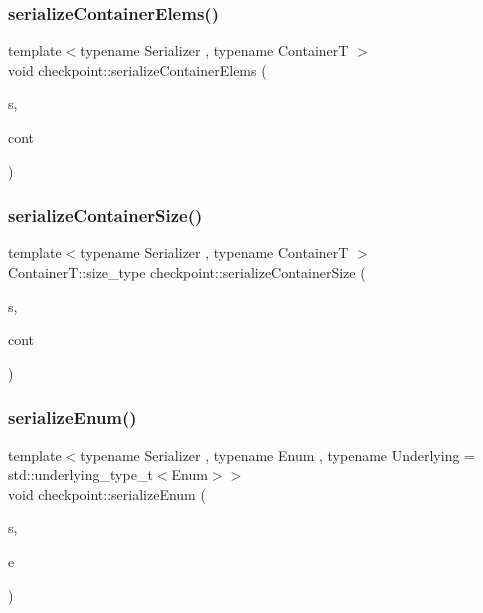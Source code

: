 \subsubsection{\texorpdfstring{serialize\+Container\+Elems()}{serializeContainerElems()}}
{\footnotesize\ttfamily template$<$typename Serializer , typename ContainerT $>$ \\
void checkpoint\+::serialize\+Container\+Elems (\begin{DoxyParamCaption}\item[{Serializer \&}]{s,  }\item[{ContainerT \&}]{cont }\end{DoxyParamCaption})\hspace{0.3cm}{\ttfamily [inline]}}

\mbox{\label{namespacecheckpoint_a3359595d5a4c6fcf5fc95069c71f869b}} 
\subsubsection{\texorpdfstring{serialize\+Container\+Size()}{serializeContainerSize()}}
{\footnotesize\ttfamily template$<$typename Serializer , typename ContainerT $>$ \\
Container\+T\+::size\+\_\+type checkpoint\+::serialize\+Container\+Size (\begin{DoxyParamCaption}\item[{Serializer \&}]{s,  }\item[{ContainerT \&}]{cont }\end{DoxyParamCaption})\hspace{0.3cm}{\ttfamily [inline]}}

\mbox{\label{namespacecheckpoint_a5f368cb543eec78bb608a68fe2401562}} 
\subsubsection{\texorpdfstring{serialize\+Enum()}{serializeEnum()}}
{\footnotesize\ttfamily template$<$typename Serializer , typename Enum , typename Underlying  = std\+::underlying\+\_\+type\+\_\+t$<$\+Enum$>$$>$ \\
void checkpoint\+::serialize\+Enum (\begin{DoxyParamCaption}\item[{Serializer \&}]{s,  }\item[{Enum \&}]{e }\end{DoxyParamCaption})}

